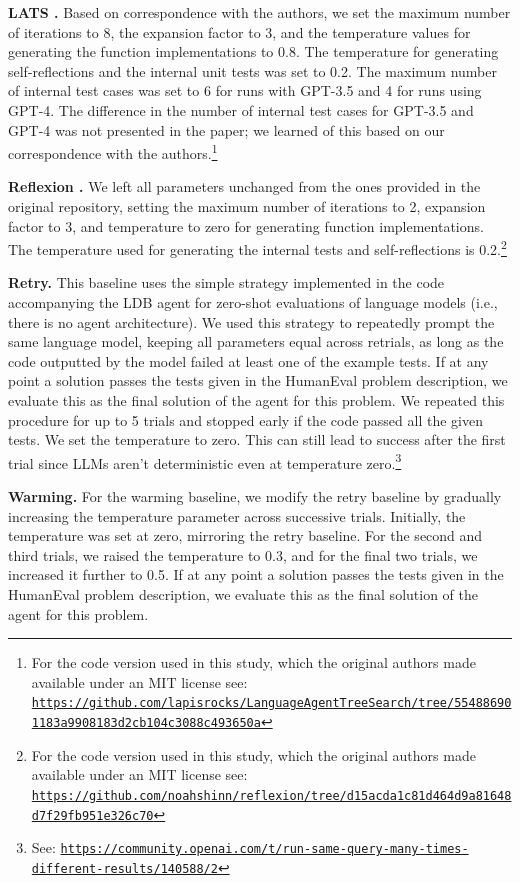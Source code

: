 \documentclass{article}
\begin{document}
\textbf{LATS \citep{zhou_language_2023}.} Based on correspondence with the authors, we set the maximum number of iterations to 8, the expansion factor to 3, and the temperature values for generating the function implementations to 0.8. The temperature for generating self-reflections and the internal unit tests was set to 0.2. The maximum number of internal test cases was set to 6 for runs with GPT-3.5 and 4 for runs using GPT-4. The difference in the number of internal test cases for GPT-3.5 and GPT-4 was not presented in the paper; we learned of this based on our correspondence with the authors.\footnote{For the code version used in this study, which the original authors made available under an  MIT license see: \texttt{\url{https://github.com/lapisrocks/LanguageAgentTreeSearch/tree/554886901183a9908183d2cb104c3088c493650a}}}

\textbf{Reflexion \citep{shinn_reflexion_2023}.} We left all parameters unchanged from the ones provided in the original repository, setting the maximum number of iterations to 2, expansion factor to 3, and temperature to zero for generating function implementations. The temperature used for generating the internal tests and self-reflections is 0.2.\footnote{For the code version used in this study, which the original authors made available under an  MIT license see: \texttt{\url{https://github.com/noahshinn/reflexion/tree/d15acda1c81d464d9a81648d7f29fb951e326c70}}}

\textbf{Retry.} This baseline uses the simple strategy implemented in the code accompanying the LDB agent for zero-shot evaluations of language models (i.e., there is no agent architecture). We used this strategy to repeatedly prompt the same language model, keeping all parameters equal across retrials, as long as the code outputted by the model failed at least one of the example tests. If at any point a solution passes the tests given in the HumanEval problem description, we evaluate this as the final solution of the agent for this problem. We repeated this procedure for up to 5 trials and stopped early if the code passed all the given tests. We set the temperature to zero. This can still lead to success after the first trial since LLMs aren't deterministic even at temperature zero.\footnote{See: \texttt{\url{https://community.openai.com/t/run-same-query-many-times-different-results/140588/2}}}

\textbf{Warming.} For the warming baseline, we modify the retry baseline by gradually increasing the temperature parameter across successive trials. Initially, the temperature was set at zero, mirroring the retry baseline. For the second and third trials, we raised the temperature to 0.3, and for the final two trials, we increased it further to 0.5. If at any point a solution passes the tests given in the HumanEval problem description, we evaluate this as the final solution of the agent for this problem. 
\end{document}

